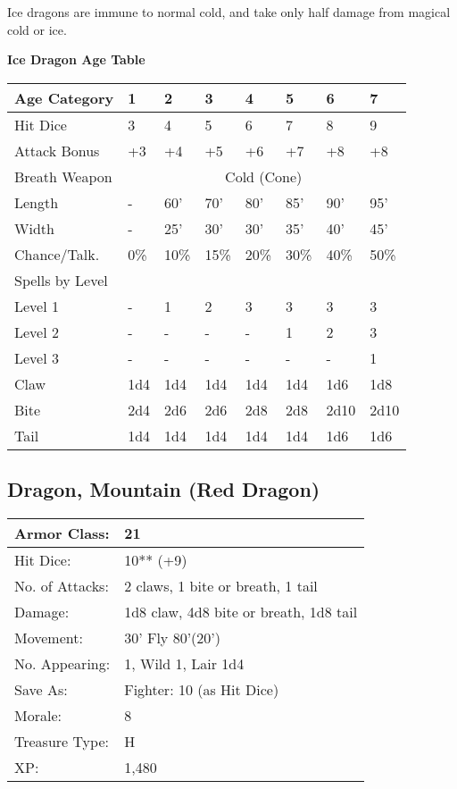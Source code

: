 \documentclass[a4paper,twoside,openany,10pt]{book}
\begin{document}
\begin{multicols}{2}
Ice dragons are immune to normal cold, and take only half damage from magical cold or ice.\\
\begin{center}
	\textbf{Ice Dragon Age Table}\\
\begin{tabularx}{0.47\textwidth}{@{}lXXXXXXX@{}}
Age Category & 1 & 2 & 3 & 4 & 5 & 6 & 7 \\\hline
Hit Dice & 3 & 4 & 5 & 6 & 7 & 8 & 9 \\\hline
Attack Bonus & +3 & +4 & +5 & +6 & +7 & +8 & +8 \\\hline
Breath Weapon & \multicolumn{7}{c}{Cold (Cone)}\\\hline
Length & - & 60' & 70' & 80' & 85' & 90' & 95' \\\hline
Width & - & 25' & 30' & 30' & 35' & 40' & 45' \\\hline
Chance/Talk. & 0\% & 10\% & 15\% & 20\% & 30\% & 40\% & 50\% \\\hline
Spells by Level & & & & & & & \\\hline
Level 1 & - & 1 & 2 & 3 & 3 & 3 & 3 \\\hline
Level 2 & - & - & - & - & 1 & 2 & 3 \\\hline
Level 3 & - & - & - & - & - & - & 1 \\\hline
Claw & 1d4 & 1d4 & 1d4 & 1d4 & 1d4 & 1d6 & 1d8 \\\hline
Bite & 2d4 & 2d6 & 2d6 & 2d8 & 2d8 & 2d10 & 2d10 \\\hline
Tail & 1d4 & 1d4 & 1d4 & 1d4 & 1d4 & 1d6 & 1d6 \\\hline
\end{tabularx}
\end{center}


\subsection*{Dragon, Mountain (Red Dragon)}\label{dragon-mountain-red-dragon}

\begin{tabularx}{0.48\textwidth}{@{}lX@{}}
Armor Class: & 21 \\\hline
Hit Dice: & 10** (+9) \\\hline
No. of Attacks: & 2 claws, 1 bite or breath, 1 tail \\\hline
Damage: & 1d8 claw, 4d8 bite or breath, 1d8 tail \\\hline
Movement: & 30' Fly 80'(20') \\\hline
No. Appearing: & 1, Wild 1, Lair 1d4 \\\hline
Save As: & Fighter: 10 (as Hit Dice) \\\hline
Morale: & 8 \\\hline
Treasure Type: & H \\\hline
XP: & 1,480 \\\hline
\end{tabularx}\medskip


\end{multicols}
\end{document}
